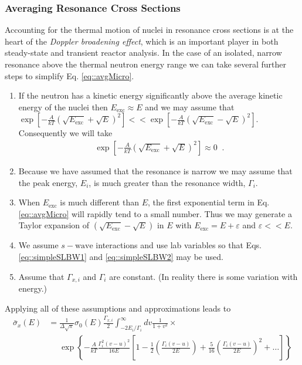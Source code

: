 \documentclass[11pt]{article}
\begin{document}
\subsubsection{Averaging Resonance Cross Sections}
\label{sec:orgheadline20}
Accounting for the thermal motion of nuclei in resonance cross sections is at the heart of the \emph{Doppler broadening effect}, which is an important player in both steady-state and transient reactor analysis.  In the case of an isolated, narrow resonance above the thermal neutron energy range we can take several further steps to simplify Eq. \eqref{eq::avgMicro}.
\begin{enumerate}
\item If the neutron has a kinetic energy significantly above the average kinetic energy of the nuclei then \(E_\text{exc} \approx E\) and we may assume that \(\exp\left[-\frac{A}{kT}\left(\sqrt{E_\text{exc}} + \sqrt{E}\right)^2\right] << \exp\left[-\frac{A}{kT}\left(\sqrt{E_\text{exc}} - \sqrt{E}\right)^2\right]\).  Consequently we will take
\begin{align}
  \exp\left[-\frac{A}{kT}\left(\sqrt{E_\text{exc}} + \sqrt{E}\right)^2\right] \approx 0 \;\;.
\end{align}
\item Because we have assumed that the resonance is narrow we may assume that the peak energy, \(E_i\), is much greater than the resonance width, \(\Gamma_i\).
\item When \(E_\text{exc}\) is much different than \(E\), the first exponential term in Eq. \eqref{eq::avgMicro} will rapidly tend to a small number.  Thus we may generate a Taylor expansion of \(\left(\sqrt{E_\text{exc}} - \sqrt{E}\right)\) in \(E\) with \(E_\text{exc} = E + \varepsilon\) and \(\varepsilon << E\).
\item We assume \(s-\text{wave}\) interactions and use lab variables so that Eqs. \eqref{eq::simpleSLBW1} and \eqref{eq::simpleSLBW2} may be used.
\item Assume that \(\Gamma_{x,i}\) and \(\Gamma_i\) are constant.  (In reality there is some variation with energy.)
\end{enumerate}
Applying all of these assumptions and approximations leads to
\begin{align}
  \label{eq::dopplerSLBWx}
  \bar{\sigma}_x(E) &= \frac{1}{\Delta \sqrt{\pi}} \sigma_0(E) \frac{\Gamma_{x,i}}{2}
                      \int_{-2E_i/\Gamma_i}^\infty dv \frac{1}{1+v^2} \times \\
                    &\phantom{=}  \exp\left\{ -\frac{A}{kT} \frac{\Gamma_i^2(v-u)^2}{16E}
                                  \left[ 1 - \frac{1}{2}\left( \frac{\Gamma_i(v-u)}{2E} \right)
                                           + \frac{5}{16}\left( \frac{\Gamma_i(v-u)}{2E} \right)^2 + \hdots \right] \right\}
\end{align}
\end{document}
